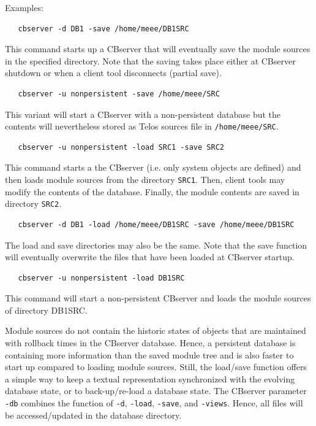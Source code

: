 Examples:

\begin{verbatim}
   cbserver -d DB1 -save /home/meee/DB1SRC
\end{verbatim}

This command starts up a CBserver that will eventually save the module sources in the specified
 directory. Note that the saving takes place either at CBserver shutdown or when a
client tool disconnects (partial save).

\begin{verbatim}
   cbserver -u nonpersistent -save /home/meee/SRC
\end{verbatim}

This variant will start a CBserver with a non-persistent database but the contents will nevertheless
stored as Telos sources file in {\tt /home/meee/SRC}.


\begin{verbatim}
   cbserver -u nonpersistent -load SRC1 -save SRC2
\end{verbatim}

This command starts a the CBserver (i.e. only system objects are defined) and then
loads module sources from the directory {\tt SRC1}. Then, client tools may
modify the contents of the database. Finally, the module contents are saved in 
directory {\tt SRC2}.

\begin{verbatim}
   cbserver -d DB1 -load /home/meee/DB1SRC -save /home/meee/DB1SRC
\end{verbatim}

The load and save directories may also be the same. Note that the save function
will eventually overwrite the files that have been loaded at CBserver startup.

\begin{verbatim}
   cbserver -u nonpersistent -load DB1SRC 
\end{verbatim}

This command will start a non-persistent CBserver and loads the module sources of
directory DB1SRC. 


Module sources do not contain the historic states of objects that are
maintained with rollback times in the CBserver database. Hence, a persistent database
is containing more information than the saved module tree and is also faster to
start up compared to loading module sources. Still, the load/save function offers
a simple way to keep a textual representation synchronized with the 
evolving database state, or to back-up/re-load a database state. 
The CBserver parameter {\tt -db}  combines the function of {\tt -d}, {\tt -load}, 
{\tt -save}, and {\tt -views}. Hence, all files will be accessed/updated in
the database directory.






